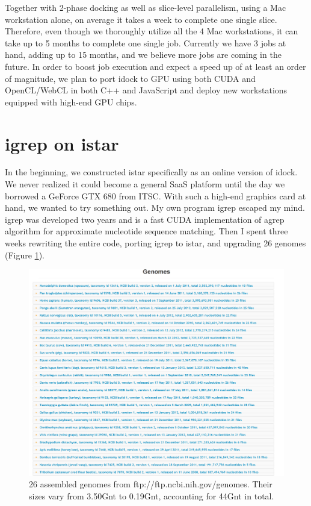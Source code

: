 Together with 2-phase docking as well as slice-level parallelism, using a Mac workstation alone, on average it takes a week to complete one single slice. Therefore, even though we thoroughly utilize all the 4 Mac workstations, it can take up to 5 months to complete one single job. Currently we have 3 jobs at hand, adding up to 15 months, and we believe more jobs are coming in the future. In order to boost job execution and expect a speed up of at least an order of magnitude, we plan to port idock to GPU using both CUDA and OpenCL/WebCL in both C++ and JavaScript and deploy new workstations equipped with high-end GPU chips.

\section{igrep on istar}

In the beginning, we constructed istar specifically as an online version of idock. We never realized it could become a general SaaS platform until the day we borrowed a GeForce GTX 680 from ITSC. With such a high-end graphics card at hand, we wanted to try something out. My own program igrep \citep{1138} escaped my mind. igrep was developed two years and is a fast CUDA implementation of agrep algorithm for approximate nucleotide sequence matching. Then I spent three weeks rewriting the entire code, porting igrep to istar, and upgrading 26 genomes (Figure \ref{istar:Genomes}).

\begin{figure}
\centering
\includegraphics[width=\linewidth]{istar/Genomes.png}
\caption{26 assembled genomes from ftp://ftp.ncbi.nih.gov/genomes. Their sizes vary from 3.50Gnt to 0.19Gnt, accounting for 44Gnt in total.}
\label{istar:Genomes}
\end{figure}

